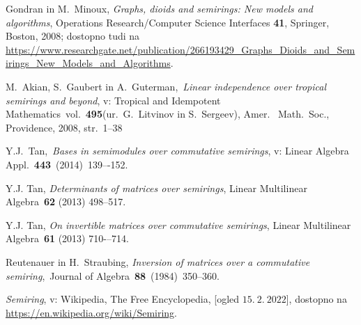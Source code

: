 \documentclass[mat1]{fmfdelo}
\begin{document}
\begin{thebibliography}{99}
	
	
	 Gondran in M.~Minoux, \emph{Graphs, dioids and semirings: New models and algorithms}, Operations Research/Computer Science Interfaces \textbf{41}, Springer, Boston, 2008; dostopno tudi na \url{https://www.researchgate.net/publication/266193429_Graphs_Dioids_and_Semirings_New_Models_and_Algorithms}.
	
	
	 M.~Akian, S.~Gaubert in A.~Guterman,~\emph{Linear independence over tropical semirings and beyond}, v: Tropical and Idempotent Mathematics~vol.~\textbf{495}(ur.\ G.~Litvinov in S.~Sergeev), Amer. \ Math.\ Soc., Providence, 2008, str.\ 1--38

	 Y.J.~Tan,~\emph{Bases in semimodules over commutative semirings}, v: Linear Algebra Appl.~\textbf{443}~(2014)~139–-152.
	
	 Y.J. Tan, \emph{Determinants of matrices over semirings}, Linear Multilinear Algebra~\textbf{62} (2013) 498--517.
	
	 Y.J. Tan, \emph{On invertible matrices over commutative semirings}, Linear Multilinear Algebra~\textbf{61} (2013) 710-–714.
	
	 Reutenauer in H.~Straubing, \emph{Inversion of matrices over a commutative semiring},~Journal of Algebra~\textbf{88}~(1984)~350--360.
	
	 \emph{Semiring}, v: Wikipedia, The Free Encyclopedia, [ogled $15.~2.~2022$], dostopno na \url{https://en.wikipedia.org/wiki/Semiring}.
	
\end{thebibliography}
\end{document}
